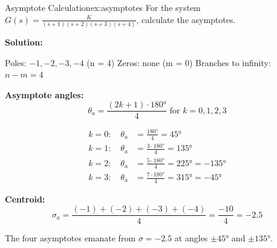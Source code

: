 \begin{example}{Asymptote Calculation}{ex:asymptotes}
For the system $G(s) = \frac{K}{(s+1)(s+2)(s+3)(s+4)}$, calculate the asymptotes.

\textbf{Solution:}

Poles: $-1, -2, -3, -4$ (n = 4)
Zeros: none (m = 0)
Branches to infinity: $n - m = 4$

\textbf{Asymptote angles:}
\[
\theta_a = \frac{(2k+1) \cdot 180°}{4} \text{ for } k = 0, 1, 2, 3
\]

\begin{align*}
k = 0: \quad \theta_a &= \frac{180°}{4} = 45° \\
k = 1: \quad \theta_a &= \frac{3 \cdot 180°}{4} = 135° \\
k = 2: \quad \theta_a &= \frac{5 \cdot 180°}{4} = 225° = -135° \\
k = 3: \quad \theta_a &= \frac{7 \cdot 180°}{4} = 315° = -45°
\end{align*}

\textbf{Centroid:}
\[
\sigma_a = \frac{(-1) + (-2) + (-3) + (-4)}{4} = \frac{-10}{4} = -2.5
\]

The four asymptotes emanate from $\sigma = -2.5$ at angles $\pm 45°$ and $\pm 135°$.
\end{example}

